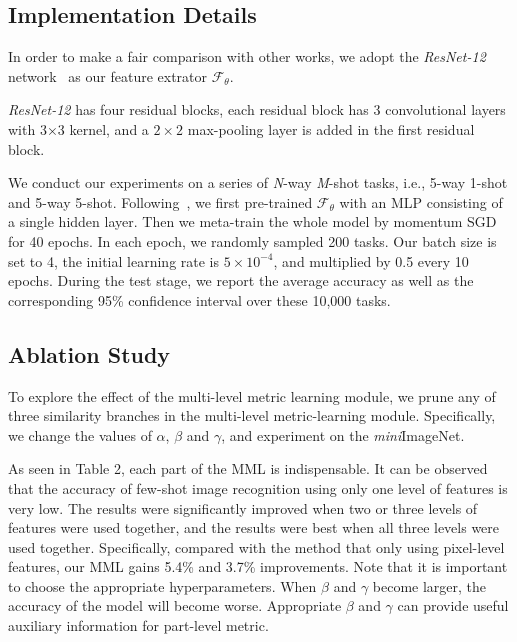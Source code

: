 \documentclass{article}
\begin{document}
\subsection{Implementation Details}
In order to make a fair comparison with other works, we adopt the \emph{ResNet-12} network~\cite{cvprLeeMRS19} as our feature extrator $\mathcal{F}_{\theta}$. 

\emph{ResNet-12} has four residual blocks, each residual block has 3 convolutional layers with 3×3 kernel, and a $2\times 2$ max-pooling layer is added in the first residual block.

We conduct our experiments on a series of \emph{N}-way \emph{M}-shot tasks, i.e., 5-way 1-shot and 5-way 5-shot.
Following~\cite{feat}, we first pre-trained $\mathcal{F}_{\theta}$ with an MLP consisting of a single hidden layer. Then we meta-train the whole model by momentum SGD for 40 epochs.
In each epoch, we randomly sampled 200 tasks. Our batch size is set to 4, the initial learning rate is $5\times10^{-4}$, and multiplied by 0.5 every 10 epochs. During the test stage, we report the average accuracy as well as the corresponding 95\% confidence interval over these 10,000 tasks.

\subsection{Ablation Study}
To explore the effect of the multi-level metric learning module, we prune any of three similarity branches in the multi-level metric-learning module. Specifically, we change the values of $\alpha$, $\beta$ and $\gamma$, and experiment on the \emph{mini}ImageNet. 

As seen in Table 2, each part of the MML is indispensable. It can be observed that the accuracy of few-shot image recognition using only one level of features is very low. The results were significantly improved when two or three levels of features were used together, and the results were best when all three levels were used together. Specifically, compared with the method that only using pixel-level features, our MML gains 5.4\% and 3.7\% improvements.
Note that it is important to choose the appropriate hyperparameters. When $\beta$ and $\gamma$ become larger, the accuracy of the model will become worse. Appropriate $\beta$ and $\gamma$ can provide useful auxiliary information for part-level metric.
\end{document}
